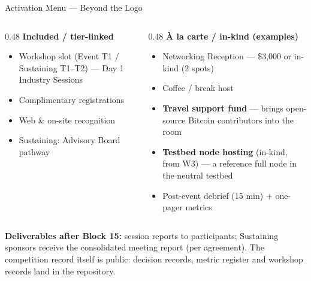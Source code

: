 \documentclass[aspectratio=169,10pt]{beamer}
\begin{document}
\begin{frame}{Activation Menu --- Beyond the Logo}
  \begin{columns}[T]
    \begin{column}{0.48\textwidth}
      {\small\textbf{Included / tier-linked}}
      \begin{itemize}\small
        \item Workshop slot (Event T1 / Sustaining T1--T2) --- Day 1 Industry Sessions
        \item Complimentary registrations
        \item Web \& on-site recognition
        \item Sustaining: Advisory Board pathway
      \end{itemize}
    \end{column}
    \begin{column}{0.48\textwidth}
      {\small\textbf{\`A la carte / in-kind (examples)}}
      \begin{itemize}\small
        \item Networking Reception --- \$3,000 or in-kind (2 spots)
        \item Coffee / break host
        \item \textbf{Travel support fund} --- brings open-source Bitcoin contributors into the room
        \item \textbf{Testbed node hosting} (in-kind, from W3) --- a reference full node in the neutral testbed
        \item Post-event debrief (15 min) + one-pager metrics
      \end{itemize}
    \end{column}
  \end{columns}
  \vspace{1mm}
  {\small\textbf{Deliverables after Block 15:} session reports to participants; Sustaining sponsors receive the consolidated meeting report (per agreement). The competition record itself is public: decision records, metric register and workshop records land in the repository.}
\end{frame}
\end{document}

